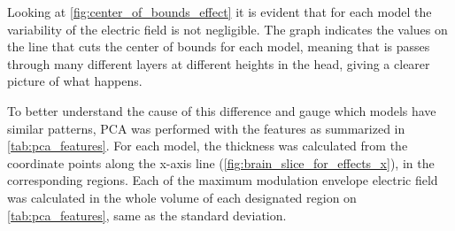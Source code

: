 Looking at \autoref{fig:center_of_bounds_effect} it is evident that for each model the variability of the electric field is not negligible. The graph indicates the values on the line that cuts the center of bounds for each model, meaning that is passes through many different layers at different heights in the head, giving a clearer picture of what happens. 

To better understand the cause of this difference and gauge which models have similar patterns, \gls{PCA} was performed with the features as summarized in \autoref{tab:pca_features}. For each model, the thickness was calculated from the coordinate points along the x-axis line (\autoref{fig:brain_slice_for_effects_x}), in the corresponding regions. Each of the maximum modulation envelope electric field was calculated in the whole volume of each designated region on \autoref{tab:pca_features}, same as the standard deviation.

